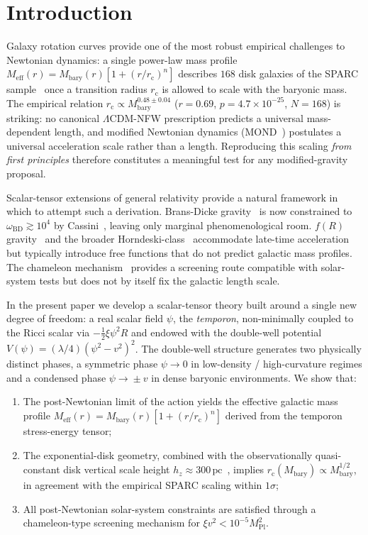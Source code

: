 \documentclass[%
    aps,
    prd,
    reprint,
    superscriptaddress,
    nofootinbib,
    floatfix,
    amsmath,amssymb,
]{revtex4-2}
\newcommand{\Meff}{M_{\mathrm{eff}}}
\newcommand{\Mbary}{M_{\mathrm{bary}}}
\newcommand{\rc}{r_{\mathrm{c}}}
\newcommand{\MPl}{M_{\mathrm{Pl}}}
\begin{document}
\section{Introduction}
\label{sec:intro}

Galaxy rotation curves provide one of the most robust empirical
challenges to Newtonian dynamics: a single power-law mass profile
$\Meff(r)=\Mbary(r)[1+(r/\rc)^{n}]$ describes $168$ disk galaxies
of the SPARC sample~\cite{Lelli2016} once a transition radius
$\rc$ is allowed to scale with the baryonic mass. The empirical
relation $\rc\propto\Mbary^{0.48\pm 0.04}$ ($r=0.69$,
$p=4.7\times 10^{-25}$, $N=168$) is striking: no canonical
$\Lambda$CDM-NFW prescription predicts a universal mass-dependent
length, and modified Newtonian dynamics
(MOND~\cite{Milgrom1983,Bekenstein2004}) postulates a universal
acceleration scale rather than a length. Reproducing this scaling
\emph{from first principles} therefore constitutes a meaningful
test for any modified-gravity proposal.

Scalar-tensor extensions of general relativity provide a natural
framework in which to attempt such a derivation. Brans-Dicke
gravity~\cite{BransDicke1961} is now constrained to
$\omega_{\mathrm{BD}}\gtrsim 10^{4}$ by Cassini~\cite{Bertotti2003},
leaving only marginal phenomenological room. $f(R)$
gravity~\cite{Sotiriou2010} and the broader
Horndeski-class~\cite{Horndeski1974,Kobayashi2019} accommodate
late-time acceleration but typically introduce free functions
that do not predict galactic mass profiles. The
chameleon mechanism~\cite{Khoury2004} provides a screening route
compatible with solar-system tests but does not by itself fix
the galactic length scale.

In the present paper we develop a scalar-tensor theory built
around a single new degree of freedom: a real scalar field $\psi$,
the \emph{temporon}, non-minimally coupled to the Ricci scalar via
$-\tfrac{1}{2}\xi\psi^{2}R$ and endowed with the double-well
potential $V(\psi)=(\lambda/4)(\psi^{2}-v^{2})^{2}$. The double-well
structure generates two physically distinct phases, a symmetric
phase $\psi\!\to\!0$ in low-density / high-curvature regimes
and a condensed phase $\psi\!\to\!\pm v$ in dense baryonic
environments. We show that:
\begin{enumerate}
\item The post-Newtonian limit of the action yields the
effective galactic mass profile
$\Meff(r)=\Mbary(r)[1+(r/\rc)^{n}]$ derived
from the temporon stress-energy tensor;
\item The exponential-disk geometry, combined with the
observationally quasi-constant disk vertical scale height
$h_{z}\!\approx\!300\,\mathrm{pc}$~\cite{Yoachim2006}, implies
$\rc(\Mbary)\propto\Mbary^{1/2}$, in agreement with the
empirical SPARC scaling within $1\sigma$;
\item All post-Newtonian solar-system constraints are
satisfied through a chameleon-type screening mechanism
for $\xi v^{2}<10^{-5}\MPl^{2}$.
\end{enumerate}
\end{document}
